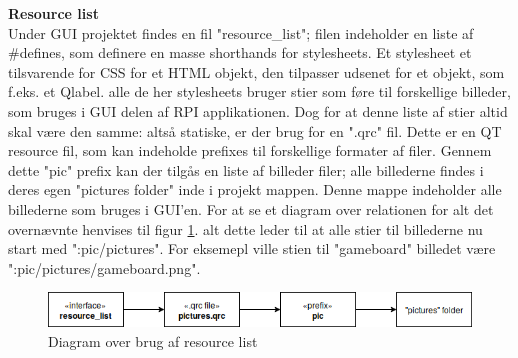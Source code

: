 \documentclass[Softwaredesign/Softwaredesign_main.tex]{subfiles}
\begin{document}
\textbf{Resource list}\\
Under GUI projektet findes en fil "resource\_list"; filen indeholder en liste af \#defines, som definere en masse shorthands for stylesheets. Et stylesheet et tilsvarende for CSS for et HTML objekt, den tilpasser udsenet for et objekt, som f.eks. et Qlabel. alle de her stylesheets bruger stier som føre til forskellige billeder,  som bruges i GUI delen af RPI applikationen.  Dog for at denne liste af stier altid skal være den samme: altså statiske, er der brug for en ".qrc" fil. Dette er en QT resource fil, som kan indeholde prefixes til forskellige formater af filer.  Gennem dette "pic" prefix kan der tilgås en liste af billeder filer;  alle billederne findes i deres egen "pictures folder" inde i projekt mappen. Denne mappe indeholder alle billederne som bruges i GUI'en.  For at se et diagram over relationen for alt det overnævnte henvises til figur \ref{fig:resource_list}.
alt dette leder til at alle stier til billederne nu start med ":pic/pictures". For eksemepl ville stien til "gameboard" billedet være ":pic/pictures/gameboard.png".
\begin{figure}
    \centering
    \includegraphics[scale=0.5]{Softwaredesign/GUI/Pictures/resource_list.png}
    \caption{Diagram over brug af resource list}
    \label{fig:resource_list}
\end{figure}
\end{document}
